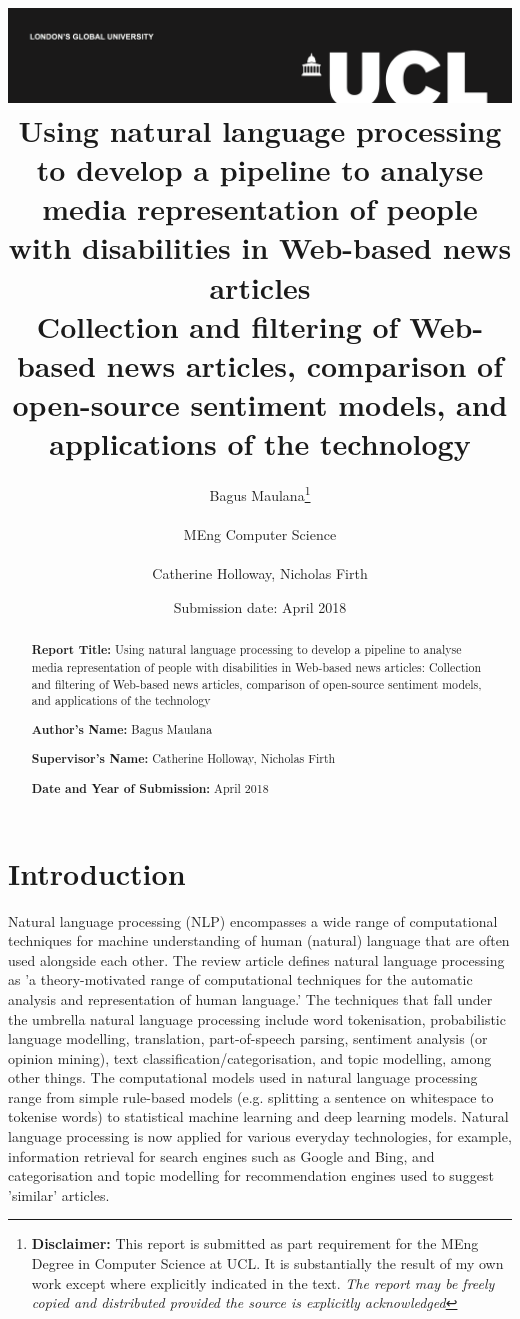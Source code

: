 \documentclass{report}
\title{{\vspace{-14em} \includegraphics[scale=0.4]{ucl_logo.png}}\\
{{\Huge Using natural language processing to develop a pipeline to analyse media representation of people with disabilities in Web-based news articles}}\\
{\large Collection and filtering of Web-based news articles, comparison of open-source sentiment models, and applications of the technology
}\\
}
\date{Submission date: \nth{30} April 2018}
\author{Bagus Maulana\thanks{
{\bf Disclaimer:}
This report is submitted as part requirement for the MEng Degree in Computer Science at UCL. It is
substantially the result of my own work except where explicitly indicated in the text.
\emph{The report may be freely copied and distributed provided the source is explicitly acknowledged}}
\\ \\
MEng Computer Science\\ \\
Catherine Holloway, Nicholas Firth}
\begin{document}
 
\onehalfspacing
\maketitle
\begin{abstract}

\textbf{Report Title:}  Using natural language processing to develop a pipeline to analyse media representation of people with disabilities in Web-based news articles: Collection and filtering of Web-based news articles, comparison of open-source sentiment models, and applications of the technology

\textbf{Author’s Name:} Bagus Maulana

\textbf{Supervisor’s Name:} Catherine Holloway, Nicholas Firth

\textbf{Date and Year of Submission:}  April 2018\\





\end{abstract}
\tableofcontents
\setcounter{page}{1}


\chapter{Introduction} %


Natural language processing (NLP) encompasses a wide range of computational techniques for machine understanding of human (natural) language that are often used alongside each other.
The review article \cite{cambria2014jumping} defines natural language processing as 'a theory-motivated range of computational techniques for the automatic analysis and representation of human language.'
The techniques that fall under the umbrella natural language processing include word tokenisation, probabilistic language modelling, translation, part-of-speech parsing, sentiment analysis (or opinion mining), text classification/categorisation, and topic modelling, among other things.
The computational models used in natural language processing range from simple rule-based models (e.g. splitting a sentence on whitespace to tokenise words) to statistical machine learning and deep learning models.
Natural language processing is now applied for various everyday technologies, for example, information retrieval for search engines such as Google and Bing, and categorisation and topic modelling for recommendation engines used to suggest 'similar' articles.
\end{document}
